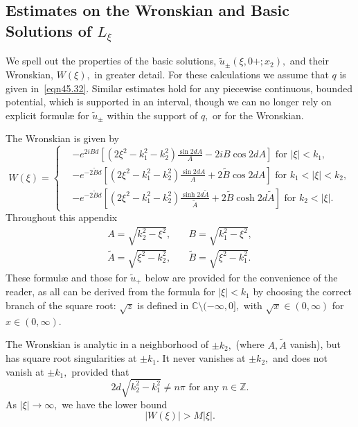 \documentclass[11pt]{article}
\newcommand\tA{\widetilde A}
\newcommand\tB{\widetilde B}
\newcommand\tu{\widetilde u}
\newcommand\bbC{\mathbb C}
\newcommand\bbZ{\mathbb Z}
\theoremstyle{definition}
\theoremstyle{remark}
\begin{document}
\subsection{Estimates on the Wronskian and Basic Solutions of $L_{\xi}$}\label{sec4.1.205}
We  spell out the properties of the basic solutions,
$\tu_{\pm}(\xi,0+;x_2),$ and their Wronskian, $W(\xi),$ in greater
detail.  For these calculations we assume that $q$ is given
in~\eqref{eqn45.32}. Similar estimates hold for any piecewise
continuous, bounded potential, which is supported in an interval,
though we can no longer rely on explicit formul{\ae} for $\tu_{\pm}$
within the support of $q,$ or for the Wronskian.

The Wronskian is given by
\begin{equation}\label{eqn87.55}
  W(\xi)=
  \begin{cases}
    &-e^{2i Bd}\left[(2\xi^2-k_1^2-k_2^2)\frac{\sin 2d A}{A}-2iB\cos
      2dA\right]\text{ for }|\xi|<k_1,\\
    &-e^{-2\tB d}\left[(2\xi^2-k_1^2-k_2^2)\frac{\sin 2d A}{A}+2\tB\cos
      2dA\right]\text{ for }k_1<|\xi|<k_2,\\
    &-e^{-2 \tB d}\left[(2\xi^2-k_1^2-k_2^2)\frac{\sinh 2d \tA}{\tA}+2\tB\cosh
      2d\tA\right]\text{ for }k_2<|\xi|.
  \end{cases}
\end{equation}
Throughout this appendix
\begin{equation}
  \begin{split}
    A=\sqrt{k_2^2-\xi^2},\quad& B=\sqrt{k_1^2-\xi^2},\\
        \tA=\sqrt{\xi^2-k_2^2},\quad& \tB=\sqrt{\xi^2-k_1^2}.
  \end{split}
\end{equation}
These formul{\ae} and those for $\tu_+$ below are provided for the convenience of the reader, as all can be
derived from the formula for $|\xi|<k_1$ by choosing the correct branch of the
square root:  $\sqrt{z}$ is defined in $\bbC\setminus (-\infty,0],$
  with $\sqrt{x}\in (0,\infty)$ for $x\in (0,\infty).$

The Wronskian is analytic in a neighborhood of $\pm k_2,$ (where $A,\tA$
vanish), but has square root singularities at $\pm k_1.$ It never vanishes at
$\pm k_2,$ and does not vanish at $\pm k_1,$ provided that
\begin{equation}
  2d\sqrt{k_2^2-k_1^2}\neq n\pi\text{ for any }n\in\bbZ.
\end{equation}
As $|\xi|\to\infty,$ we have the lower bound
\begin{equation}
  |W(\xi)|>M|\xi|.
\end{equation}
\end{document}
